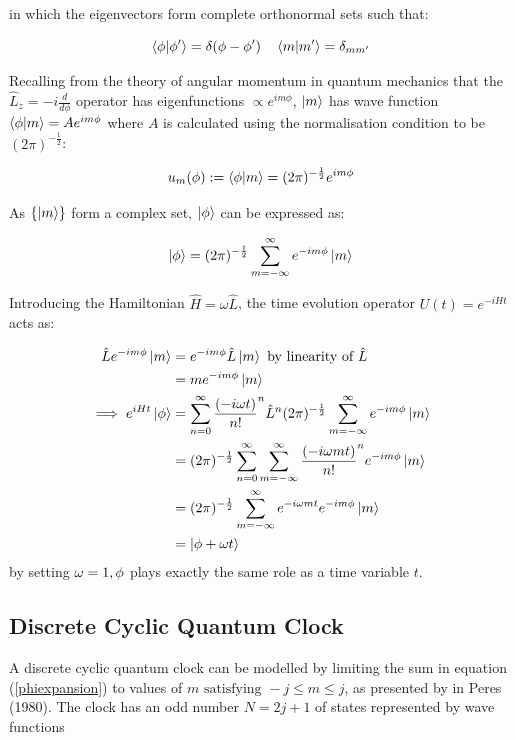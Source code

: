 \documentclass{article}
\begin{document}
\noindent in which the eigenvectors form complete orthonormal sets such that:

\begin{equation}
	\braket{\phi|\phi'} = \delta(\phi-\phi ') \quad \braket{m|m'} = \delta_{mm'}
\end{equation}

\noindent Recalling from the theory of angular momentum in quantum mechanics that the $\hat{L}_z = -i \frac{d}{d\phi}$ operator has eigenfunctions $\propto e^{im\phi}$, $\ket{m}$ has wave function $\braket{\phi|m}= Ae^{im\phi}$ where $A$ is calculated using the normalisation condition to be $(2\pi)^{-\frac{1}{2}}$:

\begin{equation}
	u_m(\phi) := \braket{\phi|m} = (2\pi)^{-\frac{1}{2}}e^{im\phi}
\end{equation}

\noindent As $\{\ket{m}\}$ form a complex set, $\ket{\phi}$ can be expressed as:

\begin{equation}
	\ket{\phi} = (2\pi)^{-\frac{1}{2}}\sum_{m=-\infty}^{\infty}e^{-im\phi}\ket{m}
	\label{phiexpansion}
\end{equation}

\noindent Introducing the Hamiltonian $\hat{H}=\omega \hat{L}$, the time evolution operator $U(t) = e^{-iHt}$ acts as:

\begin{subequations}
\begin{align}
\hat{L}e^{-im\phi}\ket{m} &= e^{-im\phi}\hat{L}\ket{m} \text{ by linearity of } \hat{L} \\
				  &= me^{-im\phi}\ket{m} \\
\implies e^{iHt}\ket{\phi} &= \sum_{n=0}^{\infty}\frac{(-i\omega t)}{n!}^n \hat{L}^n (2\pi)^{-\frac{1}{2}}\sum_{m=-\infty}^{\infty}e^{-im\phi}\ket{m} \\
			   &= (2\pi)^{-\frac{1}{2}}\sum_{n=0}^{\infty}\sum_{m=-\infty}^{\infty} \frac{(-i\omega mt)}{n!}^n e^{-im\phi} \ket{m} \\
				   &= (2\pi)^{-\frac{1}{2}}\sum_{m=-\infty}^{\infty}e^{-i\omega mt}e^{-im\phi}\ket{m} \\
				   &= \ket{\phi+\omega t}
\end{align}
\end{subequations}
\noindent by setting $\omega = 1, \space \phi$ plays exactly the same role as a time variable $t$.

\subsection{Discrete Cyclic Quantum Clock}
\label{subsection:dcqc}
A discrete cyclic quantum clock can be modelled by limiting the sum in equation (\ref{phiexpansion}) to values of \linebreak $m \text{ satisfying } -j \leq m \leq j$, as presented by in Peres (1980). The clock has an odd number $N = 2j+1$ of states represented by wave functions
\end{document}
